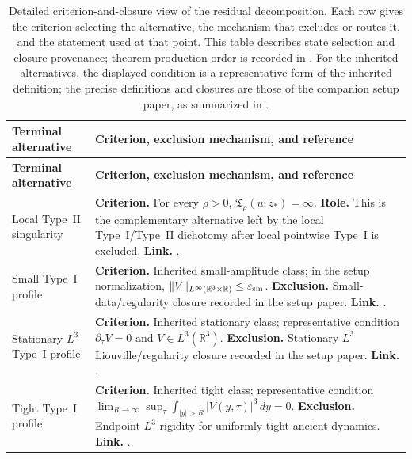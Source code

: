 \documentclass[11pt]{amsart}
\numberwithin{equation}{section}
\theoremstyle{plain}
\theoremstyle{definition}
\theoremstyle{remark}
\newcommand{\R}{\mathbb R}
\newcommand{\eps}{\varepsilon}
\begin{document}
\begingroup
\footnotesize
\setlength{\tabcolsep}{4pt}
\renewcommand{\arraystretch}{1.25}
\begin{longtable}{@{}L{1.20in}L{4.65in}@{}}
\caption{Detailed criterion-and-closure view of the residual decomposition.
Each row gives the criterion selecting the alternative, the mechanism that
excludes or routes it, and the statement used at that point.  This table
describes state selection and closure provenance; theorem-production order is
recorded in
.  For the
inherited alternatives, the displayed condition is a representative form of
the inherited definition; the precise definitions and closures are those of
the companion setup paper, as summarized in
.}
\label{tab:decision-tree-classification}\\
\hline
\textbf{Terminal alternative} & \textbf{Criterion, exclusion mechanism, and reference}\\
\hline
\endfirsthead
\hline
\textbf{Terminal alternative} & \textbf{Criterion, exclusion mechanism, and reference}\\
\hline
\endhead
\hline
\endfoot
Local Type~II singularity &
\textbf{Criterion.}  For every \(\rho>0\),
\(\mathfrak T_\rho(u;z_*)=\infty\).
\textbf{Role.}  This is the complementary alternative left by the local
Type~I/Type~II dichotomy after local pointwise Type~I is excluded.
\textbf{Link.}  .\\

Small Type~I profile &
\textbf{Criterion.}  Inherited small-amplitude class; in the setup normalization,
\(\|V\|_{L^\infty(\R^3\times\R)}\le\eps_{\rm sm}\).
\textbf{Exclusion.}  Small-data/regularity closure recorded in the setup
paper.
\textbf{Link.}  .\\

Stationary \(L^3\) Type~I profile &
\textbf{Criterion.}  Inherited stationary class; representative condition
\(\partial_\tau V=0\) and \(V\in L^3(\R^3)\).
\textbf{Exclusion.}  Stationary \(L^3\) Liouville/regularity closure recorded
in the setup paper.
\textbf{Link.}  .\\

Tight Type~I profile &
\textbf{Criterion.}  Inherited tight class; representative condition
\(\lim_{R\to\infty}\sup_\tau\int_{|y|>R}|V(y,\tau)|^3\,dy=0\).
\textbf{Exclusion.}  Endpoint \(L^3\) rigidity for uniformly tight ancient
dynamics.
\textbf{Link.}  .\\


\end{longtable}
\end{document}
